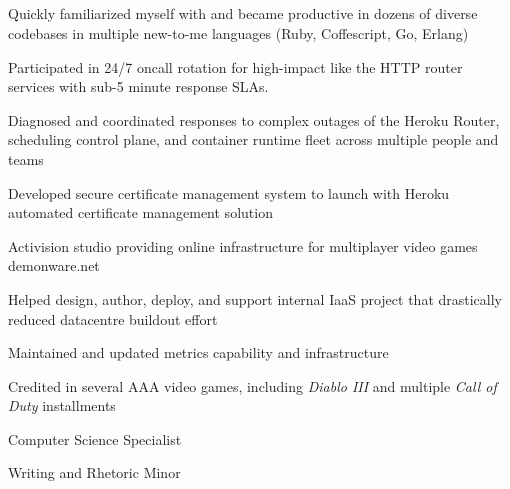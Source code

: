 \documentclass[letterpaper,11pt,notitlepage]{article}
\begin{document}
         \\
         \\
         \\
         \\
        \begin{employment}
            \item Quickly familiarized myself with and became productive in
              dozens of diverse codebases in multiple new-to-me languages (Ruby,
              Coffescript, Go, Erlang)
            \item Participated in 24/7 oncall rotation for high-impact like the HTTP router
              services with sub-5 minute response SLAs.
            \item Diagnosed and coordinated responses to complex outages of the
              Heroku Router, scheduling control plane, and container runtime
              fleet across multiple people and teams
            \item Developed secure certificate management system to launch with
              Heroku automated certificate management solution
        \end{employment}
    \companydescurl
       {Activision studio providing online infrastructure for multiplayer video
         games}
       {demonware.net} \\
    \begin{employment}
        \item Helped design, author, deploy, and support internal IaaS
              project that drastically reduced datacentre buildout effort
        \item Maintained and updated metrics capability and infrastructure
        \item Credited in several AAA video games, including
          {\it Diablo III} and multiple {\it Call of Duty} installments
    \end{employment}
    \begin{employment}
        \item Computer Science Specialist
        \item Writing and Rhetoric Minor
    \end{employment}
\vbar{}
\end{document}

